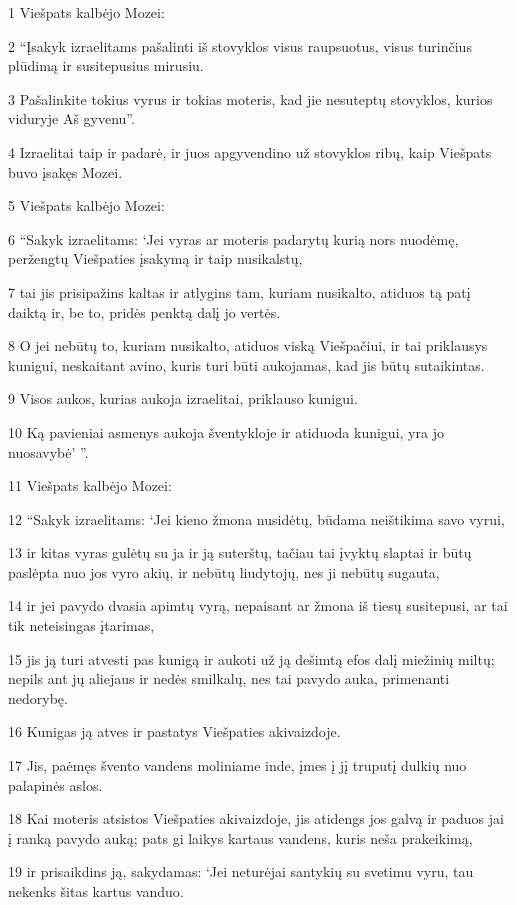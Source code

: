 \par 1 Viešpats kalbėjo Mozei: 
\par 2 “Įsakyk izraelitams pašalinti iš stovyklos visus raupsuotus, visus turinčius plūdimą ir susitepusius mirusiu. 
\par 3 Pašalinkite tokius vyrus ir tokias moteris, kad jie nesuteptų stovyklos, kurios viduryje Aš gyvenu”. 
\par 4 Izraelitai taip ir padarė, ir juos apgyvendino už stovyklos ribų, kaip Viešpats buvo įsakęs Mozei. 
\par 5 Viešpats kalbėjo Mozei: 
\par 6 “Sakyk izraelitams: ‘Jei vyras ar moteris padarytų kurią nors nuodėmę, peržengtų Viešpaties įsakymą ir taip nusikalstų, 
\par 7 tai jis prisipažins kaltas ir atlygins tam, kuriam nusikalto, atiduos tą patį daiktą ir, be to, pridės penktą dalį jo vertės. 
\par 8 O jei nebūtų to, kuriam nusikalto, atiduos viską Viešpačiui, ir tai priklausys kunigui, neskaitant avino, kuris turi būti aukojamas, kad jis būtų sutaikintas. 
\par 9 Visos aukos, kurias aukoja izraelitai, priklauso kunigui. 
\par 10 Ką pavieniai asmenys aukoja šventykloje ir atiduoda kunigui, yra jo nuosavybė’ ”. 
\par 11 Viešpats kalbėjo Mozei: 
\par 12 “Sakyk izraelitams: ‘Jei kieno žmona nusidėtų, būdama neištikima savo vyrui, 
\par 13 ir kitas vyras gulėtų su ja ir ją suterštų, tačiau tai įvyktų slaptai ir būtų paslėpta nuo jos vyro akių, ir nebūtų liudytojų, nes ji nebūtų sugauta, 
\par 14 ir jei pavydo dvasia apimtų vyrą, nepaisant ar žmona iš tiesų susitepusi, ar tai tik neteisingas įtarimas, 
\par 15 jis ją turi atvesti pas kunigą ir aukoti už ją dešimtą efos dalį miežinių miltų; nepils ant jų aliejaus ir nedės smilkalų, nes tai pavydo auka, primenanti nedorybę. 
\par 16 Kunigas ją atves ir pastatys Viešpaties akivaizdoje. 
\par 17 Jis, paėmęs švento vandens moliniame inde, įmes į jį truputį dulkių nuo palapinės aslos. 
\par 18 Kai moteris atsistos Viešpaties akivaizdoje, jis atidengs jos galvą ir paduos jai į ranką pavydo auką; pats gi laikys kartaus vandens, kuris neša prakeikimą, 
\par 19 ir prisaikdins ją, sakydamas: ‘Jei neturėjai santykių su svetimu vyru, tau nekenks šitas kartus vanduo. 
